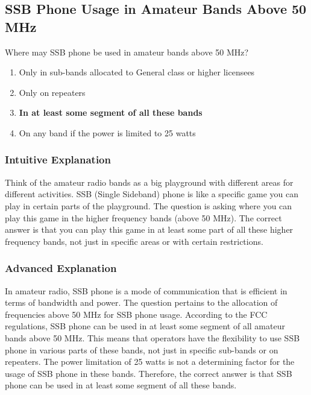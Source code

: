 \subsection{SSB Phone Usage in Amateur Bands Above 50 MHz}
\label{T1B10}

\begin{tcolorbox}[colback=gray!10!white,colframe=black!75!black,title=T1B10]
Where may SSB phone be used in amateur bands above 50 MHz?
\begin{enumerate}[label=\Alph*,noitemsep]
    \item Only in sub-bands allocated to General class or higher licensees
    \item Only on repeaters
    \item \textbf{In at least some segment of all these bands}
    \item On any band if the power is limited to 25 watts
\end{enumerate}
\end{tcolorbox}

\subsubsection*{Intuitive Explanation}
Think of the amateur radio bands as a big playground with different areas for different activities. SSB (Single Sideband) phone is like a specific game you can play in certain parts of the playground. The question is asking where you can play this game in the higher frequency bands (above 50 MHz). The correct answer is that you can play this game in at least some part of all these higher frequency bands, not just in specific areas or with certain restrictions.

\subsubsection*{Advanced Explanation}
In amateur radio, SSB phone is a mode of communication that is efficient in terms of bandwidth and power. The question pertains to the allocation of frequencies above 50 MHz for SSB phone usage. According to the FCC regulations, SSB phone can be used in at least some segment of all amateur bands above 50 MHz. This means that operators have the flexibility to use SSB phone in various parts of these bands, not just in specific sub-bands or on repeaters. The power limitation of 25 watts is not a determining factor for the usage of SSB phone in these bands. Therefore, the correct answer is that SSB phone can be used in at least some segment of all these bands.